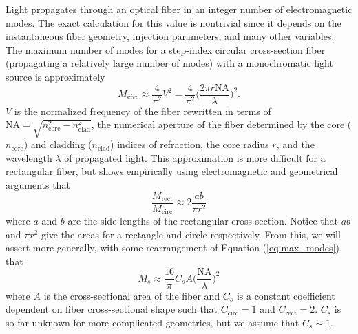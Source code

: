 Light propagates through an optical fiber in an integer number of electromagnetic modes. The exact calculation for this value is nontrivial since it depends on the instantaneous fiber geometry, injection parameters, and many other variables. The maximum number of modes for a step-index circular cross-section fiber (propagating a relatively large number of modes) with a monochromatic light source is approximately
\begin{equation}
M_{circ} \approx \frac{4}{\pi ^2} V^2 = \frac{4}{\pi ^2} \Bigg( \frac{2 \pi r \mathrm{NA}}{\lambda} \Bigg) ^2.
\label{eq:max_modes}
\end{equation}
$V$ is the normalized frequency of the fiber rewritten in terms of $\mathrm{NA} = \sqrt{n_\mathrm{core}^2 - n_\mathrm{clad}^2}$, the numerical aperture of the fiber determined by the core ($n_\mathrm{core}$) and cladding ($n_\mathrm{clad}$) indices of refraction, the core radius $r$, and the wavelength $\lambda$ of propagated light. This approximation is more difficult for a rectangular fiber, but \citet{nikitin_estimating_2011} shows empirically using electromagnetic and geometrical arguments that
\begin{equation}
\frac{M_\mathrm{rect}}{M_\mathrm{circ}} \approx 2 \frac{ab}{\pi r^2}
\label{eq:prop_modes}
\end{equation}
where $a$ and $b$ are the side lengths of the rectangular cross-section. Notice that $ab$ and $\pi r^2$ give the areas for a rectangle and circle respectively. From this, we will assert more generally, with some rearrangement of Equation (\ref{eq:max_modes}), that
\begin{equation}
M_{s} \approx \frac{16}{\pi} C_{s} A \Bigg( \frac{\mathrm{NA}}{\lambda} \Bigg) ^2
\label{eq:mode_area}
\end{equation}
where $A$ is the cross-sectional area of the fiber and $C_{s}$ is a constant coefficient dependent on fiber cross-sectional shape such that $C_\mathrm{circ} = 1$ and $C_\mathrm{rect} = 2$. $C_{s}$ is so far unknown for more complicated geometries, but we assume that $C_{s} \sim 1$.

